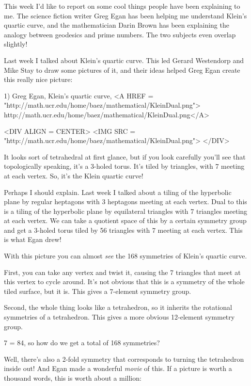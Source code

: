 

This week I'd like to report on some cool things people have been
explaining to me.  The science fiction writer Greg Egan has been 
helping me understand Klein's quartic curve, and the mathematician
Darin Brown has been explaining the analogy between geodesics and 
prime numbers.  The two subjects even overlap slightly!

Last week I talked about Klein's quartic curve.  This led
Gerard Westendorp and Mike Stay to draw some pictures of it, 
and their ideas helped Greg Egan create this really nice picture:

1) Greg Egan, Klein's quartic curve,
<A HREF = "http://math.ucr.edu/home/baez/mathematical/KleinDual.png">
http://math.ucr.edu/home/baez/mathematical/KleinDual.png</A>

<DIV ALIGN = CENTER>
<IMG SRC = "http://math.ucr.edu/home/baez/mathematical/KleinDual.png">
</DIV>


It looks sort of tetrahedral at first glance, but if you look 
carefully you'll see that topologically speaking, it's a 3-holed
torus.  It's tiled by triangles, with 7 meeting at each vertex.  
So, it's the Klein quartic curve!

Perhaps I should explain.  Last week I talked about a tiling of the 
hyperbolic plane by regular heptagons with 3 heptagons meeting at 
each vertex.  Dual to this is a tiling of the hyperbolic plane by 
equilateral triangles with 7 triangles meeting at each vertex.  
We can take a quotient space of this by a certain symmetry group 
and get a 3-holed torus tiled by 56 triangles with 7 meeting at each
vertex.  This is what Egan drew!

With this picture you can almost \emph{see} the 168 symmetries of Klein's 
quartic curve.

First, you can take any vertex and twist it, causing the 7 triangles
that meet at this vertex to cycle around.  It's not obvious that this
is a symmetry of the whole tiled surface, but it is.  This gives a 
7-element symmetry group.  

Second, the whole thing looks like a tetrahedron, so it inherits the
rotational symmetries of a tetrahedron.  This gives a more obvious
12-element symmetry group.  

7  = 84, so how do we get a total of 168 symmetries?

Well, there's also a 2-fold symmetry that corresponds to turning 
the tetrahedron inside out!  And Egan made a wonderful \emph{movie} of 
this.  If a picture is worth a thousand words, this is worth about 
a million:

